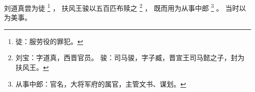 
\switchcolumn*[\section{}]

刘道真尝为徒%
\footnote{%
    徒：服劳役的罪犯。
}%
，
扶风王骏以五百匹布赎之%
\footnote{%
    刘宝：字道真，西晋官员。
    骏：司马骏，字子臧，晋宣王司马懿之子，封为扶风王。
}%
，
既而用为从事中郎%
\footnote{%
    从事中郎：官名，大将军府的属官，主管文书、谋划。
}%
。
当时以为美事。

\switchcolumn


